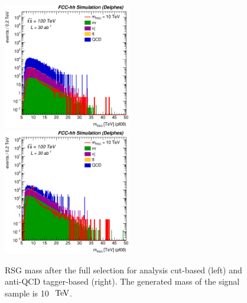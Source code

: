 \documentclass{cernrep}
\begin{document}
\begin{figure}[!htb]\centering
\includegraphics[width=0.495\textwidth]{Fig/RSGww/Mj1j2_pf08_sel2_nostack_log.eps}
\includegraphics[width=0.495\textwidth]{Fig/RSGww/Mj1j2_pf08_sel4_nostack_log.eps}
\caption{RSG mass after the full selection for analysis cut-based (left) and anti-QCD tagger-based (right). The generated mass of the signal sample is 10 $\TeV$.}
\label{fig:RSGww_mass_sel_final}
\end{figure}
\end{document}
